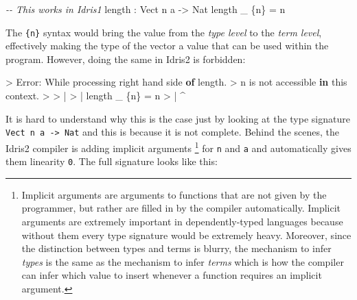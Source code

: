 \documentclass[
]{article}
\newenvironment{Shaded}{}{}
\newcommand{\CommentTok}[1]{\textcolor[rgb]{0.38,0.63,0.69}{\textit{#1}}}
\newcommand{\DataTypeTok}[1]{\textcolor[rgb]{0.56,0.13,0.00}{#1}}
\newcommand{\FunctionTok}[1]{\textcolor[rgb]{0.02,0.16,0.49}{#1}}
\newcommand{\KeywordTok}[1]{\textcolor[rgb]{0.00,0.44,0.13}{\textbf{#1}}}
\newcommand{\NormalTok}[1]{#1}
\newcommand{\OperatorTok}[1]{\textcolor[rgb]{0.40,0.40,0.40}{#1}}
\newcommand{\OtherTok}[1]{\textcolor[rgb]{0.00,0.44,0.13}{#1}}
\begin{document}
\begin{Shaded}
\begin{Highlighting}[]
\CommentTok{{-}{-} This works in Idris1}
\FunctionTok{length} \OperatorTok{:} \DataTypeTok{Vect}\NormalTok{ n a }\OtherTok{{-}\textgreater{}} \DataTypeTok{Nat}
\FunctionTok{length}\NormalTok{ \_ \{n\} }\OtherTok{=}\NormalTok{ n}
\end{Highlighting}
\end{Shaded}

The \texttt{\{n\}} syntax would bring the value from the \emph{type
level} to the \emph{term level}, effectively making the type of the
vector a value that can be used within the program. However, doing the
same in Idris2 is forbidden:

\begin{Shaded}
\begin{Highlighting}[]
\OperatorTok{\textgreater{}} \DataTypeTok{Error}\OperatorTok{:} \DataTypeTok{While}\NormalTok{ processing right hand side }\KeywordTok{of} \FunctionTok{length}\OperatorTok{.} 
\OperatorTok{\textgreater{}}\NormalTok{   n is }\FunctionTok{not}\NormalTok{ accessible }\KeywordTok{in}\NormalTok{ this context}\OperatorTok{.}
\OperatorTok{\textgreater{}} 
\OperatorTok{\textgreater{}}     \OperatorTok{|}
\OperatorTok{\textgreater{}}     \OperatorTok{|} \FunctionTok{length}\NormalTok{ \_ \{n\} }\OtherTok{=}\NormalTok{ n}
\OperatorTok{\textgreater{}}     \OperatorTok{|}                \OperatorTok{\^{}}
\end{Highlighting}
\end{Shaded}

It is hard to understand why this is the case just by looking at the
type signature \texttt{Vect\ n\ a\ -\textgreater{}\ Nat} and this is
because it is not complete. Behind the scenes, the Idris2 compiler is
adding implicit arguments \footnote{Implicit arguments are arguments to
  functions that are not given by the programmer, but rather are filled
  in by the compiler automatically. Implicit arguments are extremely
  important in dependently-typed languages because without them every
  type signature would be extremely heavy. Moreover, since the
  distinction between types and terms is blurry, the mechanism to infer
  \emph{types} is the same as the mechanism to infer \emph{terms} which
  is how the compiler can infer which value to insert whenever a
  function requires an implicit argument.} for \texttt{n} and \texttt{a}
and automatically gives them linearity \texttt{0}. The full signature
looks like this:
\end{document}
